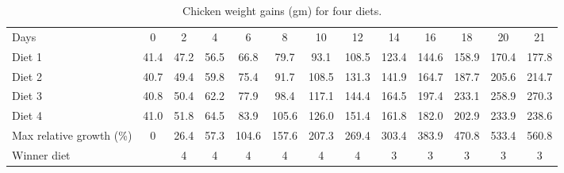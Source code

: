 \begin{table*}
\centering
\caption{Chicken weight gains (gm) for four diets.} 
\label{tab:chick}
\begin{tabular}{lcccccccccccc}
  \toprule
  \midrule
Days & 0 & 2 & 4 & 6 & 8 & 10 & 12 & 14 & 16 & 18 & 20 & 21 \\ 
  Diet 1 & 41.4 & 47.2 & 56.5 & 66.8 & 79.7 & 93.1 & 108.5 & 123.4 & 144.6 & 158.9 & 170.4 & 177.8 \\ 
  Diet 2 & 40.7 & 49.4 & 59.8 & 75.4 & 91.7 & 108.5 & 131.3 & 141.9 & 164.7 & 187.7 & 205.6 & 214.7 \\ 
  Diet 3 & 40.8 & 50.4 & 62.2 & 77.9 & 98.4 & 117.1 & 144.4 & 164.5 & 197.4 & 233.1 & 258.9 & 270.3 \\ 
  Diet 4 & 41.0 & 51.8 & 64.5 & 83.9 & 105.6 & 126.0 & 151.4 & 161.8 & 182.0 & 202.9 & 233.9 & 238.6 \\ 
  Max relative growth (\%) & 0 & 26.4 & 57.3 & 104.6 & 157.6 & 207.3 & 269.4 & 303.4 & 383.9 & 470.8 & 533.4 & 560.8 \\ 
  Winner diet &  & 4 & 4 & 4 & 4 & 4 & 4 & 3 & 3 & 3 & 3 & 3 \\ 
   \bottomrule
\end{tabular}
\end{table*}
